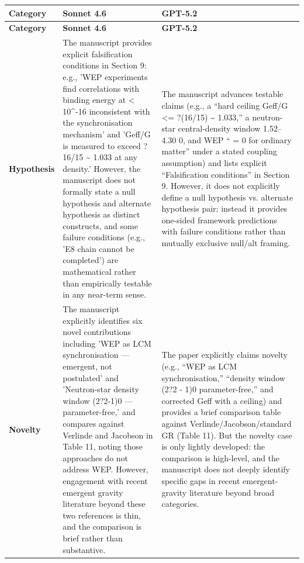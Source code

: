 \documentclass[11pt]{article}
\begin{document}
\begin{longtable}{@{} p{2.2cm} p{6.3cm} p{6.3cm} @{}}
\toprule
\textbf{Category} & \textbf{Sonnet 4.6} & \textbf{GPT-5.2} \\
\midrule
\endfirsthead
\toprule
\textbf{Category} & \textbf{Sonnet 4.6} & \textbf{GPT-5.2} \\
\midrule
\endhead
\bottomrule
\endlastfoot

\rowcolor{rowgray}
\textbf{Hypothesis} &
The manuscript provides explicit falsification conditions in Section 9: e.g., 'WEP experiments find correlations with binding energy at \texteta{} < 10\textasciicircum{}-16 inconsistent with the synchronisation mechanism' and 'Geff/G is measured to exceed ?16/15 \textasciitilde{} 1.033 at any density.' However, the manuscript does not formally state a null hypothesis and alternate hypothesis as distinct constructs, and some failure conditions (e.g., 'E8 chain cannot be completed') are mathematical rather than empirically testable in any near-term sense. &
The manuscript advances testable claims (e.g., a ``hard ceiling Geff/G \textless{}= ?(16/15) \textasciitilde{} 1.033,'' a neutron-star central-density window 1.52--4.30 \textrho{}0, and WEP ``\texteta{} = 0 for ordinary matter'' under a stated coupling assumption) and lists explicit ``Falsification conditions'' in Section 9. However, it does not explicitly define a null hypothesis vs. alternate hypothesis pair; instead it provides one-sided framework predictions with failure conditions rather than mutually exclusive null/alt framing. \\[6pt]

\textbf{Novelty} &
The manuscript explicitly identifies six novel contributions including 'WEP as LCM synchronisation --- emergent, not postulated' and 'Neutron-star density window (2?2-1)\textrho{}0 --- parameter-free,' and compares against Verlinde and Jacobson in Table 11, noting those approaches do not address WEP. However, engagement with recent emergent gravity literature beyond these two references is thin, and the comparison is brief rather than substantive. &
The paper explicitly claims novelty (e.g., ``WEP as LCM synchronisation,'' ``density window (2?2 - 1)\textrho{}0 parameter-free,'' and corrected Geff with a ceiling) and provides a brief comparison table against Verlinde/Jacobson/standard GR (Table 11). But the novelty case is only lightly developed: the comparison is high-level, and the manuscript does not deeply identify specific gaps in recent emergent-gravity literature beyond broad categories. \\[6pt]


\end{longtable}
\end{document}
